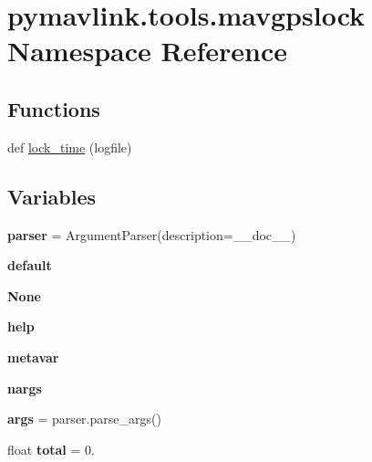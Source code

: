 \hypertarget{namespacepymavlink_1_1tools_1_1mavgpslock}{}\section{pymavlink.\+tools.\+mavgpslock Namespace Reference}
\label{namespacepymavlink_1_1tools_1_1mavgpslock}
\subsection*{Functions}
\begin{DoxyCompactItemize}
\item 
def \hyperlink{namespacepymavlink_1_1tools_1_1mavgpslock_ae6a0ce5a3f2fe9b9606f2e60149a3da6}{lock\+\_\+time} (logfile)
\end{DoxyCompactItemize}
\subsection*{Variables}
\begin{DoxyCompactItemize}
\item 
\mbox{\label{namespacepymavlink_1_1tools_1_1mavgpslock_a8e832f448bfc5b7630182bafc8da2ce9}} 
{\bfseries parser} = Argument\+Parser(description=\+\_\+\+\_\+doc\+\_\+\+\_\+)
\item 
\mbox{\label{namespacepymavlink_1_1tools_1_1mavgpslock_a4cef6c24707d7697782aed2147e8d51a}} 
{\bfseries default}
\item 
\mbox{\label{namespacepymavlink_1_1tools_1_1mavgpslock_a7b66918b776eb4b648739f157232e807}} 
{\bfseries None}
\item 
\mbox{\label{namespacepymavlink_1_1tools_1_1mavgpslock_a914bf70e459f7517614de1bb37ad6f33}} 
{\bfseries help}
\item 
\mbox{\label{namespacepymavlink_1_1tools_1_1mavgpslock_a97b05b92db3c526847b599250e271ca0}} 
{\bfseries metavar}
\item 
\mbox{\label{namespacepymavlink_1_1tools_1_1mavgpslock_a993744546fb7a332e0f23c0e29bd8525}} 
{\bfseries nargs}
\item 
\mbox{\label{namespacepymavlink_1_1tools_1_1mavgpslock_a33276294667978e2a2f759ce0d530cea}} 
{\bfseries args} = parser.\+parse\+\_\+args()
\item 
\mbox{\label{namespacepymavlink_1_1tools_1_1mavgpslock_aa9d92f4a34bd654b37cf6fb30414ad3f}} 
float {\bfseries total} = 0.
\end{DoxyCompactItemize}


